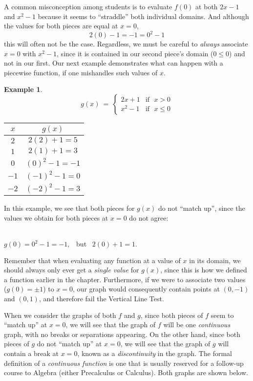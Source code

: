 \documentclass[12pt]{book}
\theoremstyle{definition}
\newtheorem{example}{Example}
\begin{document}
A common misconception among students is to evaluate $f(0)$ at both $2x-1$ and $x^2-1$ because it seems to ``straddle'' both individual domains.  And although the values for both pieces are equal at $x=0$,
$$2(0)-1=-1=0^2-1$$ this will often not be the case.  Regardless, we must be careful to \textit{always} associate $x=0$ with $x^2-1$, since it is contained in our second piece's domain ($0\leq 0$) and not in our first.  Our next example demonstrates what can happen with a piecewise function, if one mishandles such values of $x$.
\begin{example} 
\[ g(x)~=~
	\begin{cases} 
      2x+1 & \text{if~~} x> 0\\
			x^2-1 & \text{if~~} x\leq 0
  \end{cases}
\]
\begin{multicols}{2}
\begin{center}
\begin{tabular}{c|c}
	$x$ & $g(x)$\\
	\hline
	$2$ & $2(2)+1=5$\\
	\hline
	$1$ & $2(1)+1=3$\\
	\hline \hline
	$0$ & $(0)^2-1=-1$\\
	\hline
	$-1$ & $(-1)^2-1=0$\\
	\hline
	$-2$ & $(-2)^2-1=3$
\end{tabular}
\end{center}

\columnbreak

In this example, we see that both pieces for $g(x)$ do not ``match up'', since the values we obtain for both pieces at $x=0$ do not agree:\\
\ \par
$g(0)=0^2-1=-1,$ \ but \ $2(0)+1=1.$
\end{multicols}
\end{example}
Remember that when evaluating any function at a value of $x$ in its domain, we should always only ever get a {\it single value} for $g(x)$, since this is how we defined a function earlier in the chapter.  Furthermore, if we were to associate two values ($g(0)=\pm 1$) to $x=0$, our graph would consequently contain points at $(0,-1)$ and $(0,1)$, and therefore fail the Vertical Line Test.\par
When we consider the graphs of both $f$ and $g$, since both pieces of $f$ seem to ``match up'' at $x=0$, we will see that the graph of $f$ will be one {\it continuous} graph, with no breaks or separations appearing.  On the other hand, since both pieces of $g$ do not ``match up'' at $x=0$, we will see that the graph of $g$ will contain a break at $x=0$, known as a {\it discontinuity} in the graph.  The formal definition of a {\it continuous function} is one that is usually reserved for a follow-up course to Algebra (either Precalculus or Calculus).  Both graphs are shown below.
\end{document}
